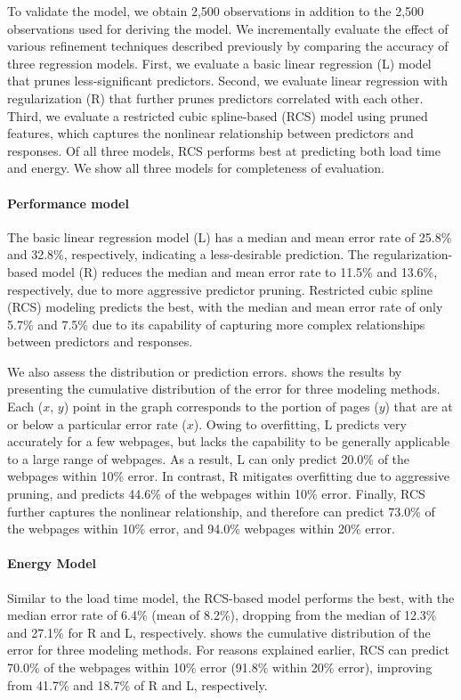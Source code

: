 To validate the model, we obtain 2,500 observations in addition to the 2,500 observations used for deriving the model. We incrementally evaluate the effect of various refinement techniques described previously by comparing the accuracy of three regression models. First, we evaluate a basic linear regression (L) model that prunes less-significant predictors. Second, we evaluate linear regression with regularization (R) that further prunes predictors correlated with each other. Third, we evaluate a restricted cubic spline-based (RCS) model using pruned features, which captures the nonlinear relationship between predictors and responses. Of all three models, RCS performs best at predicting both load time and energy. We show all three models for completeness of evaluation.

\paragraph{Performance model} The basic linear regression model (L) has a median and mean error rate of 25.8\% and 32.8\%, respectively, indicating a less-desirable prediction. The regularization-based model (R) reduces the median and mean error rate to 11.5\% and 13.6\%, respectively, due to more aggressive predictor pruning. Restricted cubic spline (RCS) modeling predicts the best, with the median and mean error rate of only 5.7\% and 7.5\% due to its capability of capturing more complex relationships between predictors and responses.

We also assess the distribution or prediction errors.  shows the results by presenting the cumulative distribution of the error for three modeling methods. Each ($x$, $y$) point in the graph corresponds to the portion of pages ($y$) that are at or below a particular error rate ($x$). Owing to overfitting, L predicts very accurately for a few webpages, but lacks the capability to be generally applicable to a large range of webpages.  As a result, L can only predict 20.0\% of the webpages within 10\% error. In contrast, R mitigates overfitting due to aggressive pruning, and predicts 44.6\% of the webpages within 10\% error. Finally, RCS further captures the nonlinear relationship, and therefore can predict 73.0\% of the webpages within 10\% error, and 94.0\% webpages within 20\% error.

\paragraph{Energy Model} Similar to the load time model, the RCS-based model performs the best, with the median error rate of 6.4\% (mean of 8.2\%), dropping from the median of 12.3\% and 27.1\% for R and L, respectively.  shows the cumulative distribution of the error for three modeling methods. For reasons explained earlier, RCS can predict 70.0\% of the webpages within 10\% error (91.8\% within 20\% error), improving from 41.7\% and 18.7\% of R and L, respectively.

